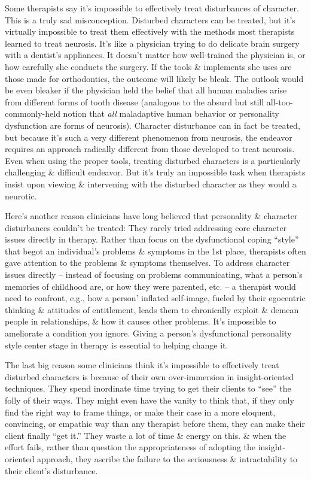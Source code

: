 \documentclass{article}
\numberwithin{equation}{section}
\begin{document}
Some therapists say it's impossible to effectively treat disturbances of character. This is a truly sad misconception. Disturbed characters can be treated, but it's virtually impossible to treat them effectively with the methods most therapists learned to treat neurosis. It's like a physician trying to do delicate brain surgery with a dentist's appliances. It doesn't matter how well-trained the physician is, or how carefully she conducts the surgery. If the tools \& implements she uses are those made for orthodontics, the outcome will likely be bleak. The outlook would be even bleaker if the physician held the belief that all human maladies arise from different forms of tooth disease (analogous to the absurd but still all-too-commonly-held notion that \textit{all} maladaptive human behavior or personality dysfunction are forms of neurosis). Character disturbance can in fact be treated, but because it's such a very different phenomenon from neurosis, the endeavor requires an approach radically different from those developed to treat neurosis. Even when using the proper tools, treating disturbed characters is a particularly challenging \& difficult endeavor. But it's truly an impossible task when therapists insist upon viewing \& intervening with the disturbed character as they would a neurotic.

Here's another reason clinicians have long believed that personality \& character disturbances couldn't be treated: They rarely tried addressing core character issues directly in therapy. Rather than focus on the dysfunctional coping ``style'' that begot an individual's problems \& symptoms in the 1st place, therapists often gave attention to the problems \& symptoms themselves. To address character issues directly -- instead of focusing on problems communicating, what a person's memories of childhood are, or how they were parented, etc. -- a therapist would need to confront, e.g., how a person' inflated self-image, fueled by their egocentric thinking \& attitudes of entitlement, leads them to chronically exploit \& demean people in relationships, \& how it causes other problems. It's impossible to ameliorate a condition you ignore. Giving a person's dysfunctional personality style center stage in therapy is essential to helping change it.

The last big reason some clinicians think it's impossible to effectively treat disturbed characters is because of their own over-immersion in insight-oriented techniques. They spend inordinate time trying to get their clients to ``see'' the folly of their ways. They might even have the vanity to think that, if they only find the right way to frame things, or make their case in a more eloquent, convincing, or empathic way than any therapist before them, they can make their client finally ``get it.'' They waste a lot of time \& energy on this. \& when the effort fails, rather than question the appropriateness of adopting the insight-oriented approach, they ascribe the failure to the seriousness \& intractability to their client's disturbance.
\end{document}
